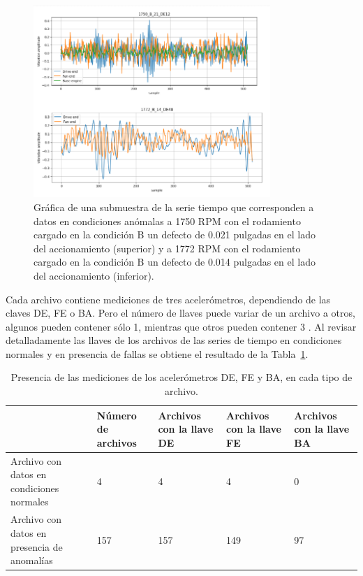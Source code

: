 \documentclass[11pt,a4paper,spanish]{book}
\numberwithin{equation}{chapter}
\numberwithin{figure}{chapter}
\begin{document}
\begin{figure}[h]
    \centering
    \includegraphics[width=0.8\textwidth]{media/dataset/anomaly-series.png}
    \caption{Gráfica de una submuestra de la serie tiempo que corresponden a datos en condiciones anómalas a 1750 RPM con el rodamiento cargado en la condición B un defecto de 0.021 pulgadas en el lado del accionamiento (superior) y a 1772 RPM con el rodamiento cargado en la condición B un defecto de 0.014 pulgadas en el lado del accionamiento (inferior). }
    \label{fig:figAnomalySeries}
\end{figure}


Cada archivo contiene mediciones de tres acelerómetros, dependiendo de las claves DE, FE o BA. Pero el número de llaves puede variar de un archivo a otros, algunos pueden contener sólo 1, mientras que otros pueden contener 3 \cite{rigas2024marine}. Al revisar detalladamente las llaves de los archivos de las series de tiempo en condiciones normales y en presencia de fallas  se obtiene el resultado de la Tabla~\ref{tab:tab1keys}. 


\begin{table}[h]
\centering
\footnotesize
\renewcommand{\arraystretch}{1.5} %
\begin{tabularx}{\textwidth}{|l|X|X|X|X|}
    \hline
    \textbf{} & 
    \textbf{Número de archivos} & 
    \textbf{Archivos con la llave DE} & 
    \textbf{Archivos con la llave FE} & 
    \textbf{Archivos con la llave BA} \\
    \hline
    Archivo con datos en condiciones normales & 4 & 4 & 4 & 0 \\
    \hline
    Archivo con datos en presencia de anomalías & 157 & 157 & 149 & 97 \\
    \hline
\end{tabularx}
\caption{Presencia de las mediciones de los acelerómetros DE, FE y BA, en cada tipo de archivo.}
\label{tab:tab1keys}
\end{table}
\end{document}
